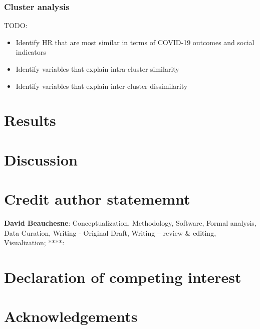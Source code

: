 \documentclass[preprint, 3p,
authoryear]{elsarticle} %
\providecommand{\tightlist}{%
  \setlength{\itemsep}{0pt}\setlength{\parskip}{0pt}}
\begin{document}
\hypertarget{cluster-analysis}{%
\subsubsection{Cluster analysis}\label{cluster-analysis}}

TODO:

\begin{itemize}
\tightlist
\item
  Identify HR that are most similar in terms of COVID-19 outcomes and
  social indicators
\item
  Identify variables that explain intra-cluster similarity
\item
  Identify variables that explain inter-cluster dissimilarity
\end{itemize}

\hypertarget{results}{%
\section{Results}\label{results}}

\hypertarget{discussion}{%
\section{Discussion}\label{discussion}}

\hypertarget{credit-author-statememnt}{%
\section*{Credit author statememnt}\label{credit-author-statememnt}}

\textbf{David Beauchesne}: Conceptualization, Methodology, Software,
Formal analysis, Data Curation, Writing - Original Draft, Writing --
review \& editing, Visualization; ****:

\hypertarget{declaration-of-competing-interest}{%
\section*{Declaration of competing
interest}\label{declaration-of-competing-interest}}

\hypertarget{acknowledgements}{%
\section*{Acknowledgements}\label{acknowledgements}}
\end{document}
